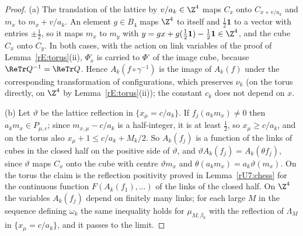 \begin{proof}
(a) The translation of the lattice by $v/a_k\in\Z^4$ maps $C_x$ onto
$C_{x+v/a_k}$ and $m_x$ to $m_x+v/a_k$. An element $g\in B_4$ maps
$\Z^4$ to itself and $\frac12\mathbf1$ to a vector with entries $\pm\frac12$,
so it maps $m_x$ to $m_y$ with $y=gx+g(\frac12\mathbf1)-\frac12\mathbf1\in\Z^4$,
and the cube $C_x$ onto $C_y$. In both cases, with the action on link
variables of the proof of Lemma~\ref{rE:torus}(ii), $\Phi^\square_x$ is carried
to $\Phi^\square$ of the image cube, because $\ReTr Q^{-1}=\ReTr Q$. Hence
$A_k(f\circ\gamma^{-1})$ is the image of $A_k(f)$ under the corresponding
transformation of configurations, which preserves $\nu_k$ (on the torus
directly, on $\Z^4$ by Lemma~\ref{rE:torus}(ii)); the constant $c_k$ does not
depend on $x$.

(b) Let $\vartheta$ be the lattice reflection in $\{x_\mu=c/a_k\}$. If
$f_j(a_km_x)\ne0$ then $a_km_x\in P_{\mu,c}$; since $m_{x,\mu}-c/a_k$ is a
half-integer, it is at least $\frac12$, so $x_\mu\ge c/a_k$, and on the torus
also $x_\mu+1\le c/a_k+M_k/2$. So $A_k(f_j)$ is a function of the links of
cubes in the closed half on the positive side of $\vartheta$, and
$\vartheta A_k(f_j)=A_k(\theta f_j)$, since $\vartheta$ maps $C_x$ onto the
cube with centre $\vartheta m_x$ and $\theta(a_km_x)=a_k\vartheta(m_x)$. On
the torus the claim is the reflection positivity proved in
Lemma~\ref{rU7:chess} for the continuous function $F(A_k(f_1),\dots)$ of the
links of the closed half. On $\Z^4$ the variables $A_k(f_j)$ depend on
finitely many links; for each large $M$ in the sequence defining $\omega_k$
the same inequality holds for $\mu_{M,\beta_k}$ with the reflection of
$\Lambda_M$ in $\{x_\mu=c/a_k\}$, and it passes to the limit.
\end{proof}

